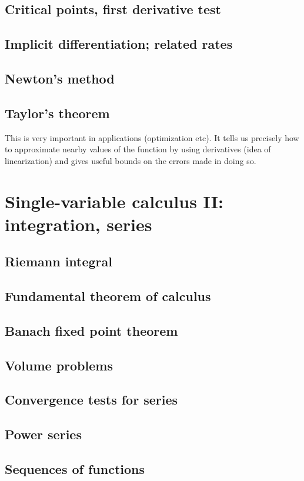 \subsection{Critical points, first derivative test}
\subsection{Implicit differentiation; related rates}
\subsection{Newton's method}
\subsection{Taylor's theorem}

This is very important in applications (optimization etc). It tells us precisely how to approximate nearby values of the function by using derivatives (idea of linearization) and gives useful bounds on the errors made in doing so.

\section{{\color{violet}Single-variable calculus II}: integration, series}

\subsection{Riemann integral}
\subsection{Fundamental theorem of calculus}
\subsection{Banach fixed point theorem}
\subsection{Volume problems}
\subsection{Convergence tests for series}
\subsection{Power series}
\subsection{Sequences of functions}
